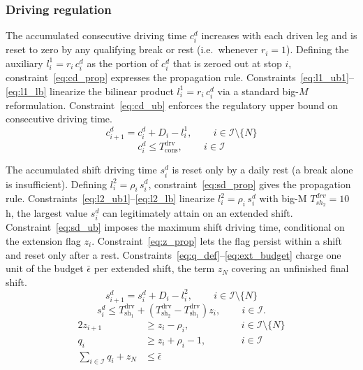 \subsubsection{Driving regulation}
The accumulated consecutive driving time $c_i^d$ increases with each driven leg and is reset to zero by any qualifying break or rest (i.e.\ whenever $r_i = 1$). Defining the auxiliary $l_i^1 = r_i\, c_i^d$ as the portion of $c_i^d$ that is zeroed out at stop $i$, constraint~\eqref{eq:cd_prop} expresses the propagation rule. Constraints~\eqref{eq:l1_ub1}--\eqref{eq:l1_lb} linearize the bilinear product $l_i^1 = r_i\, c_i^d$ via a standard big-$M$ reformulation. Constraint~\eqref{eq:cd_ub} enforces the regulatory upper bound on consecutive driving time.
\begin{equation}
    c_{i+1}^d = c_i^d + D_i - l_i^1, \qquad \, i \in \mathcal{I}\setminus\{N\} \label{eq:cd_prop}
\end{equation}
\begin{equation}
    c_i^d \leq T^{\mathrm{drv}}_{\mathrm{cons}}, \qquad \, i \in \mathcal{I} \label{eq:cd_ub}
\end{equation}

The accumulated shift driving time $s_i^d$ is reset only by a daily rest (a break alone is insufficient). Defining $l_i^2 = \rho_i\, s_i^d$, constraint~\eqref{eq:sd_prop} gives the propagation rule. Constraints~\eqref{eq:l2_ub1}--\eqref{eq:l2_lb} linearize $l_i^2 = \rho_i\, s_i^d$ with big-M $T^{drv}_{sh_2} = 10$\,h, the largest value $s^d_i$ can legitimately attain on an extended shift. Constraint~\eqref{eq:sd_ub} imposes the maximum shift driving time, conditional on the extension flag $z_i$. Constraint~\eqref{eq:z_prop} lets the flag persist within a shift and reset only after a rest. Constraints~\eqref{eq:q_def}--\eqref{eq:ext_budget} charge one unit of the  budget $\bar\epsilon$ per extended shift, the term $z_N$ covering an unfinished final shift.
\begin{equation}
    s_{i+1}^d = s_i^d + D_i - l_i^2, \qquad \, i \in \mathcal{I}\setminus\{N\} \label{eq:sd_prop}
\end{equation}
\begin{equation}
    s_i^d \leq T^{\mathrm{drv}}_{\mathrm{sh_1}} +(T^{\mathrm{drv}}_{\mathrm{sh_2}} - T^{\mathrm{drv}}_{\mathrm{sh_1}}) z_i , \qquad \, i \in \mathcal{I}. \label{eq:sd_ub}
\end{equation}
\begin{alignat}{2}
    z_{i+1} &\geq z_i - \rho_i, &\qquad& i \in \mathcal{I}\setminus\{N\} \label{eq:z_prop}\\
    q_i &\geq z_i + \rho_i - 1, &\qquad& i \in \mathcal{I} \label{eq:q_def}\\
    \sum_{i \in \mathcal I} q_i + z_N &\leq \bar\epsilon && \label{eq:ext_budget}
\end{alignat}


